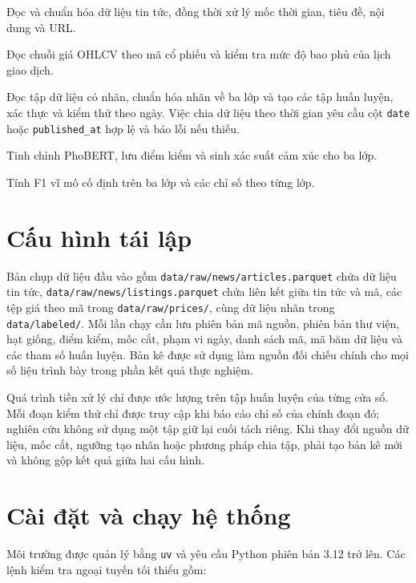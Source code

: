 \documentclass[12pt, a4paper, oneside]{report}
\begin{document}
\begin{description}[style=nextline, nosep]
  \item[\texttt{stf.data.news}] Đọc và chuẩn hóa dữ liệu tin tức, đồng thời xử lý mốc thời gian, tiêu đề,
  nội dung và URL.
  \item[\texttt{stf.data.prices}] Đọc chuỗi giá OHLCV theo mã cổ phiếu và kiểm tra mức độ
  bao phủ của lịch giao dịch.
  \item[\texttt{stf.sentiment.dataset}] Đọc tập dữ liệu có nhãn, chuẩn hóa nhãn về ba lớp và tạo
  các tập huấn luyện, xác thực và kiểm thử theo ngày. Việc chia dữ liệu theo thời gian yêu cầu cột \texttt{date} hoặc \texttt{published\_at} hợp lệ và báo lỗi nếu thiếu.
  \item[\texttt{stf.sentiment.model}] Tinh chỉnh PhoBERT, lưu điểm kiểm và sinh xác suất cảm xúc cho ba lớp.
  \item[\texttt{stf.sentiment.metrics}] Tính F1 vĩ mô cố định trên ba lớp và các chỉ số theo từng lớp.
\end{description}
\section{Cấu hình tái lập}

Bản chụp dữ liệu đầu vào gồm \texttt{data/raw/news/articles.parquet} chứa dữ liệu tin tức,
\texttt{data/raw/news/listings.parquet} chứa liên kết giữa tin tức và mã, các tệp giá theo mã
trong \texttt{data/raw/prices/}, cùng dữ liệu nhãn trong \texttt{data/labeled/}.
Mỗi lần chạy cần lưu phiên bản mã nguồn, phiên bản thư viện, hạt giống, điểm kiểm, mốc cắt,
phạm vi ngày, danh sách mã, mã băm dữ liệu và các tham số huấn luyện. Bản kê được sử dụng
làm nguồn đối chiếu chính cho mọi số liệu trình bày trong phần kết quả thực nghiệm.

Quá trình tiền xử lý chỉ được ước lượng trên tập huấn luyện của từng cửa sổ. Mỗi đoạn kiểm thử
chỉ được truy cập khi báo cáo chỉ số của chính đoạn đó; nghiên cứu không sử dụng một tập giữ lại
cuối tách riêng. Khi thay đổi nguồn dữ liệu, mốc cắt, ngưỡng tạo nhãn hoặc phương pháp chia tập,
phải tạo bản kê mới và không gộp kết quả giữa hai cấu hình.
\section{Cài đặt và chạy hệ thống}

Môi trường được quản lý bằng \texttt{uv} và yêu cầu Python phiên bản 3.12 trở lên. Các lệnh kiểm tra ngoại tuyến tối thiểu gồm:
\end{document}
